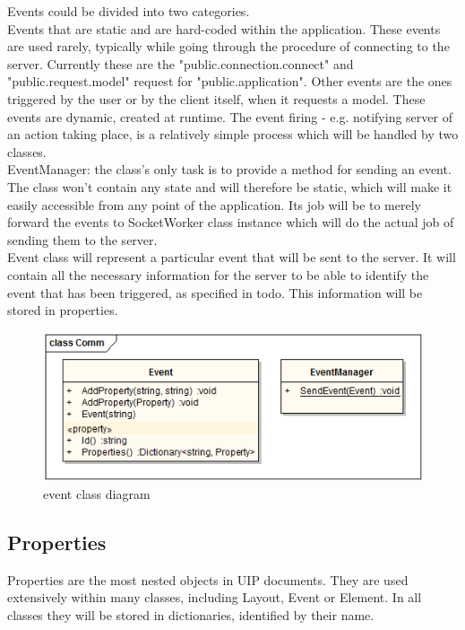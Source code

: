 Events could be divided into two categories.\\
Events that are static and are hard-coded within the application. These events are used rarely, typically while going through the procedure of connecting to the server. Currently these are the "public.connection.connect" and "public.request.model" request for "public.application".
Other events are the ones triggered by the user or by the client itself, when it requests a model. These events are dynamic, created at runtime. The event firing - e.g. notifying server of an action taking place, is a relatively simple process which will be handled by two classes.\\
EventManager: the class's only task is to provide a method for sending an event. The class won't contain any state and will therefore be static, which will make it easily accessible from any point of the application. Its job will be to merely forward the events to SocketWorker class instance which will do the actual job of sending them to the server.\\
Event class will represent a particular event that will be sent to the server. It will contain all the necessary information for the server to be able to identify the event that has been triggered, as specified in todo. This information will be stored in properties.

\begin{figure}[ht!]
\centering
\includegraphics[width=130mm]{pics/3/classEvent.png}
\caption{event class diagram}
\label{fig:classEvent}
\end{figure}

\subsection{Properties}
Properties are the most nested objects in UIP documents. They are used extensively within many classes, including Layout, Event or Element. In all classes they will be stored in dictionaries, identified by their name.

